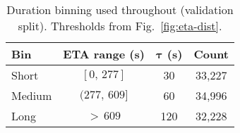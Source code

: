 \begin{table}[t]
    \centering
    \caption{Overall and per-bin validation MAE (seconds) averaged over seeds 42--44 (best epoch per seed). Improvement is relative to the AVG baseline.}
    \label{tab:results_overall_bins}
\end{table}


\begin{table}[t]
    \centering
    \caption{Duration binning used throughout (validation split). Thresholds from Fig.~\ref{fig:eta-dist}.}
    \label{tab:binning}
    \begin{tabular}{@{}lccc@{}}
        \toprule
        \textbf{Bin} & \textbf{ETA range (s)} & $\boldsymbol{\tau}$ \textbf{(s)} & \textbf{Count} \\
        \midrule
        Short  & $[0,\,277]$       & 30  & 33{,}227 \\
        Medium & $(277,\,609]$     & 60  & 34{,}996 \\
        Long   & $>\,609$          & 120 & 32{,}228 \\
        \bottomrule
    \end{tabular}
\end{table}

